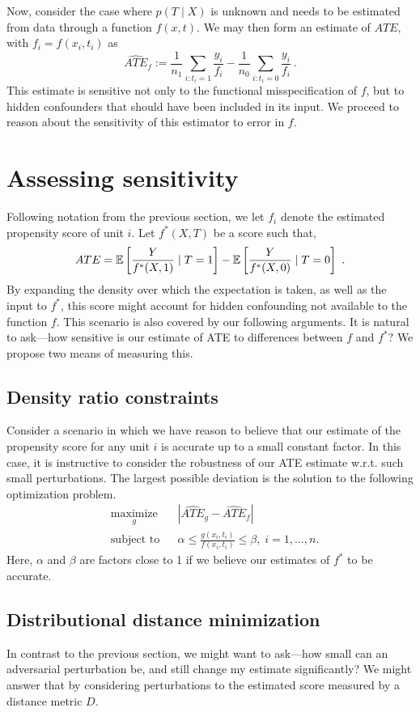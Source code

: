 Now, consider the case where $p(T \mid X)$ is unknown and needs to be estimated from data through a function $f(x, t)$. We may then form an estimate of $ATE$, with $f_i = f(x_i, t_i)$ as
$$
\hat{ATE}_f := \frac{1}{n_1}\sum_{i : t_i = 1}\frac{y_i}{f_i} - \frac{1}{n_0}\sum_{i : t_i = 0}\frac{y_i}{f_i}~.
$$
This estimate is sensitive not only to the functional misspecification of $f$, but to hidden confounders that should have been included in its input. We proceed to reason about the sensitivity of this estimator to error in $f$.

\section{Assessing sensitivity}
Following notation from the previous section, we let $f_i$ denote the estimated propensity score of unit $i$. Let $f^*(X, T)$ be a score such that,
$$
ATE = \mathbb{E}\left[\frac{Y}{f^*(X, 1)} \mid T=1\right] - \mathbb{E}\left[\frac{Y}{f^*(X, 0)} \mid T=0\right]~.
$$
By expanding the density over which the expectation is taken, as well as the input to $f^*$, this score might account for hidden confounding not available to the function $f$. This scenario is also covered by our following arguments. It is natural to ask---how sensitive is our estimate of ATE to differences between $f$ and $f^*$? We propose two means of measuring this.

\subsection{Density ratio constraints}
Consider a scenario in which we have reason to believe that our estimate of the propensity score for any unit $i$ is accurate up to a small constant factor. In this case, it is instructive to consider the robustness of our ATE estimate w.r.t. such small perturbations. The largest possible deviation is the solution to the following optimization problem.
\begin{equation*}
\begin{aligned}
& \underset{g}{\text{maximize}}
& & |\hat{ATE}_{g}- \hat{ATE}_f| \\
& \text{subject to}
& & \alpha \leq \frac{g(x_i, t_i)}{f(x_i, t_i)} \leq \beta, \; i = 1, \ldots, n.
\end{aligned}
\end{equation*}
Here, $\alpha$ and $\beta$ are factors close to 1 if we believe our estimates of $f^*$ to be accurate.

\subsection{Distributional distance minimization}
In contrast to the previous section, we might want to ask---how small can an adversarial perturbation be, and still change my estimate significantly? We might answer that by considering perturbations to the estimated score measured by a distance metric $D$.

